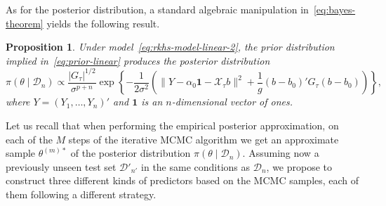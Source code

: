\documentclass[ba]{imsart}
\numberwithin{equation}{section}
\theoremstyle{plain}
\newtheorem{proposition}{Proposition}[section]
\begin{document}
As for the posterior distribution, a standard algebraic manipulation in~\eqref{eq:bayes-theorem} yields the following result.

\begin{proposition}
Under model~\eqref{eq:rkhs-model-linear-2}, the prior distribution implied in~\eqref{eq:prior-linear} produces the posterior distribution
\[
\pi(\theta \mid \mathcal D_n) \propto \frac{|G_\tau|^{1/2}}{\sigma^{p+n}} \exp\left\{ -\frac{1}{2\sigma^2} \left(\|Y- \alpha_0\bm{1} - \mathcal X_\tau b\|^2 + \frac{1}{g}(b - b_0)'G_\tau(b - b_0) \right) \right\},
\]
where \(Y=(Y_1,\dots,Y_n)'\) and \(\bm{1}\) is an \(n\)-dimensional vector of ones.
\end{proposition}

Let us recall that when performing the empirical posterior approximation, on each of the \(M\) steps of the iterative MCMC algorithm we get an approximate sample \(\theta^{(m)*}\) of the posterior distribution \(\pi(\theta\mid \mathcal D_n)\). Assuming now a previously unseen test set \(\mathcal D'_{n'}\) in the same conditions as \(\mathcal D_n\), we propose to construct three different kinds of predictors based on the MCMC samples, each of them following a different strategy.
\end{document}
